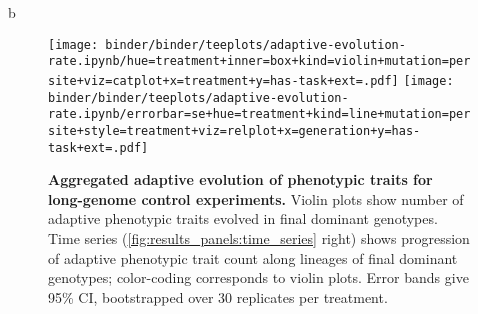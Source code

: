b\begin{figure*}
    \centering
    \texttt{[image: binder/binder/teeplots/adaptive-evolution-rate.ipynb/hue=treatment+inner=box+kind=violin+mutation=per site+viz=catplot+x=treatment+y=has-task+ext=.pdf]}%
    \texttt{[image: binder/binder/teeplots/adaptive-evolution-rate.ipynb/errorbar=se+hue=treatment+kind=line+mutation=per site+style=treatment+viz=relplot+x=generation+y=has-task+ext=.pdf]}
    \caption{
        \textbf{Aggregated adaptive evolution of phenotypic traits for long-genome control experiments.}
        \small Violin plots show number of adaptive phenotypic traits evolved in final dominant genotypes.
        Time series (\ref{fig:results_panels:time_series} right) shows progression of adaptive phenotypic trait count along lineages of final dominant genotypes; color-coding corresponds to violin plots.
        Error bands give 95\% CI, bootstrapped over 30 replicates per treatment.
    }
    \label{fig:adaptive-evolution-rate-agg}
\end{figure*}
